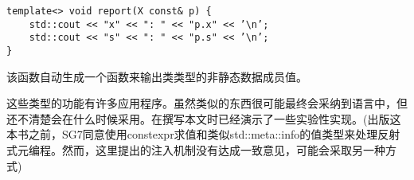 \begin{lstlisting}[style=styleCXX]
template<> void report(X const& p) {
	std::cout << "x" << ": " << "p.x" << ’\n’;
	std::cout << "s" << ": " << "p.s" << ’\n’;
}
\end{lstlisting}

该函数自动生成一个函数来输出类类型的非静态数据成员值。

这些类型的功能有许多应用程序。虽然类似的东西很可能最终会采纳到语言中，但还不清楚会在什么时候采用。在撰写本文时已经演示了一些实验性实现。(出版这本书之前，SG7同意使用constexpr求值和类似std::meta::info的值类型来处理反射式元编程。然而，这里提出的注入机制没有达成一致意见，可能会采取另一种方式)

























